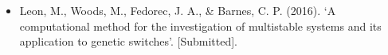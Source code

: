 \begin{itemize}
	\item Leon, M., Woods, M., Fedorec, J. A., \& Barnes, C. P. (2016). ‘A computational method for the investigation of multistable systems and its application to genetic switches’. [Submitted].
	
\end{itemize}